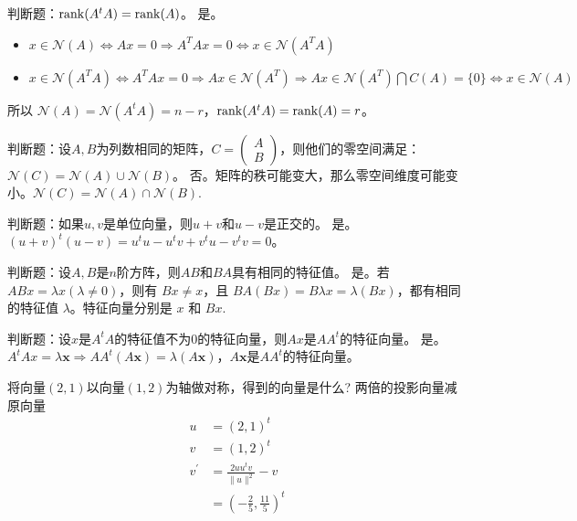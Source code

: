 \begin{problem}
	判断题：$\rank(A^tA)=\rank(A)$。
	\solution 是。\begin{itemize}
		\item $x \in \mathcal{N}(A) \Longleftrightarrow A x=0 \Longrightarrow A^{T} A x=0 \Longleftrightarrow x \in \mathcal{N}(A^TA)$
		\item $x \in \mathcal{N}(A^TA) \Longleftrightarrow A^{T} A x=0 \Longrightarrow A x \in \mathcal{N}\left(A^{T}\right) \Longrightarrow A x \in \mathcal{N}\left(A^{T}\right) \bigcap C(A)=\{0\} \Longleftrightarrow x \in \mathcal{N}(A)$
	\end{itemize}
	所以 $\mathcal{N}(A) = \mathcal{N}(A^tA) = n - r$，$\rank(A^tA) = \rank(A) = r$。
\end{problem}

\begin{problem}
	判断题：设$A,B$为列数相同的矩阵，$C=\begin{pmatrix}A\\B\end{pmatrix}$，则他们的零空间满足：$\mathcal{N}(C)=\mathcal{N}(A)\cup \mathcal{N}(B)$。
	\solution 否。矩阵的秩可能变大，那么零空间维度可能变小。$\mathcal{N}(C) = \mathcal{N}(A)\cap \mathcal{N}(B)$.
\end{problem}

\begin{problem}
	判断题：如果$u,v$是单位向量，则$u+v$和$u-v$是正交的。
	\solution 是。$(u + v)^t(u - v) = u^tu - u^tv + v^tu - v^tv = 0$。
\end{problem}

\begin{problem}
	判断题：设$A,B$是$n$阶方阵，则$AB$和$BA$具有相同的特征值。
	\solution 是。若 $ABx = \lambda x(\lambda \neq 0)$，则有 $Bx \neq x$，且 $BA(Bx) = B\lambda x = \lambda (Bx)$，都有相同的特征值 $\lambda$。特征向量分别是 $x$ 和 $Bx$.
\end{problem}

\begin{problem}
	判断题：设$x$是$A^tA$的特征值不为$0$的特征向量，则$Ax$是$AA^t$的特征向量。
	\solution 是。$A^tAx = \lambda\boldsymbol{x} \Longrightarrow AA^t(A\boldsymbol{x}) = \lambda (A\boldsymbol{x})$，$A\boldsymbol{x}$是$AA^t$的特征向量。
\end{problem}

\begin{problem}
	将向量$(2,1)$以向量$(1,2)$为轴做对称，得到的向量是什么?
	\solution 两倍的投影向量减原向量
	\begin{align*}
		u &= (2, 1)^t\\
		v &= (1, 2)^t\\
		v^\prime &= \frac{2uu^tv}{\|u\|^2} - v\\
		&=\left(-\frac{2}{5}, \frac{11}{5}\right)^t
	\end{align*}
\end{problem}

